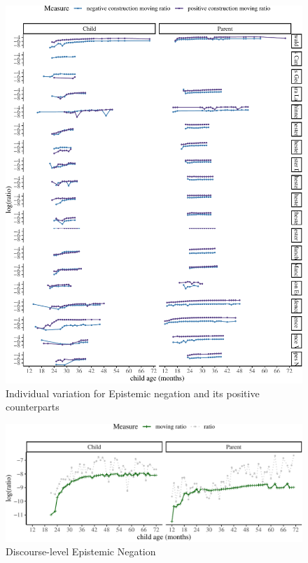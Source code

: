 \documentclass[
  english,
  man,floatsintext]{apa6}
\begin{document}
\begin{figure}[H]

{\centering \includegraphics{neg_construction_article_files/figure-latex/individualepistemic-1} 

}

\caption{Individual variation for Epistemic negation and its positive counterparts}\label{fig:individualepistemic}
\end{figure}

\begin{figure}[H]

{\centering \includegraphics{neg_construction_article_files/figure-latex/epistemicdiscourse-1} 

}

\caption{Discourse-level Epistemic Negation}\label{fig:epistemicdiscourse}
\end{figure}
\end{document}
